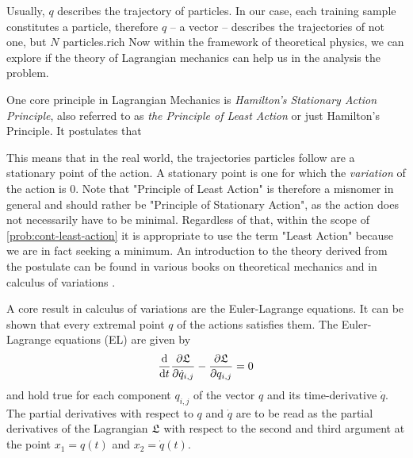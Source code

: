 Usually, $q$ describes the trajectory of particles.
In our case, each training sample constitutes a particle, therefore $q$ -- a vector -- describes the trajectories of not one, but $N$ particles.rich 
Now within the framework of theoretical physics, we can explore if the theory of Lagrangian mechanics can help us in the analysis the problem.

One core principle in Lagrangian Mechanics is \emph{Hamilton's Stationary Action Principle}, also referred to as \emph{the Principle of Least Action} or just Hamilton's Principle.
It postulates that\vspace{.5em}
\newline
{}

This means that in the real world, the trajectories particles follow are a stationary point of the action.
A stationary point is one for which the \emph{variation} of the action is $0$.
Note that "Principle of Least Action" is therefore a misnomer in general and should rather be "Principle of Stationary Action", as the action does not necessarily have to be minimal.
Regardless of that, within the scope of \cref{prob:cont-least-action} it is appropriate to use the term "Least Action" because we are in fact seeking a minimum.
An introduction to the theory derived from the postulate can be found in various books on theoretical mechanics \cite{goldstein01, marsden10, feynman63} and in calculus of variations \cite{kielhofer18}.

A core result in calculus of variations are the Euler-Lagrange equations.
It can be shown that every extremal point $q$ of the actions satisfies them.
The Euler-Lagrange equations (EL) are given by
\begin{equation}
\frac{\mathrm{d}}{\mathrm{d}t} \frac{\partial \mathfrak{L}}{\partial \dot{q}_{i, j}} - \frac{\partial \mathfrak{L}}{\partial q_{i, j}} = 0
\end{equation}
and hold true for each component $q_{i, j}$ of the vector $q$ and its time-derivative $\dot{q}$.
The partial derivatives with respect to $q$ and $\dot{q}$ are to be read as the partial derivatives of the Lagrangian $\mathfrak{L}$ with respect to the second and third argument at the point $x_1 = q(t)$ and $x_2 = \dot{q}(t)$.

